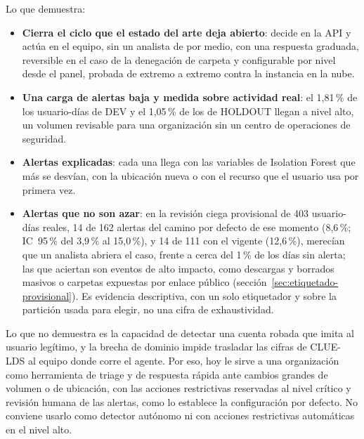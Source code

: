 Lo que demuestra:
\begin{itemize}
  \item \textbf{Cierra el ciclo que el estado del arte deja abierto}: decide en la API y actúa en el equipo, sin un analista de por medio, con una respuesta graduada, reversible en el caso de la denegación de carpeta y configurable por nivel desde el panel, probada de extremo a extremo contra la instancia en la nube.
  \item \textbf{Una carga de alertas baja y medida sobre actividad real}: el 1,81\,\% de los usuario-días de DEV y el 1,05\,\% de los de HOLDOUT llegan a nivel alto, un volumen revisable para una organización sin un centro de operaciones de seguridad.
  \item \textbf{Alertas explicadas}: cada una llega con las variables de Isolation Forest que más se desvían, con la ubicación nueva o con el recurso que el usuario usa por primera vez.
  \item \textbf{Alertas que no son azar}: en la revisión ciega provisional de 403 usuario-días reales, 14 de 162 alertas del camino por defecto de ese momento (8,6\,\%; IC~95\,\% del 3,9\,\% al 15,0\,\%), y 14 de 111 con el vigente (12,6\,\%), merecían que un analista abriera el caso, frente a cerca del 1\,\% de los días sin alerta; las que aciertan son eventos de alto impacto, como descargas y borrados masivos o carpetas expuestas por enlace público (sección~\ref{sec:etiquetado-provisional}). Es evidencia descriptiva, con un solo etiquetador y sobre la partición usada para elegir, no una cifra de exhaustividad.
\end{itemize}

Lo que no demuestra es la capacidad de detectar una cuenta robada que imita al usuario legítimo, y la brecha de dominio impide trasladar las cifras de CLUE-LDS al equipo donde corre el agente. Por eso, hoy le sirve a una organización como herramienta de triage y de respuesta rápida ante cambios grandes de volumen o de ubicación, con las acciones restrictivas reservadas al nivel crítico y revisión humana de las alertas, como lo establece la configuración por defecto. No conviene usarlo como detector autónomo ni con acciones restrictivas automáticas en el nivel alto.

